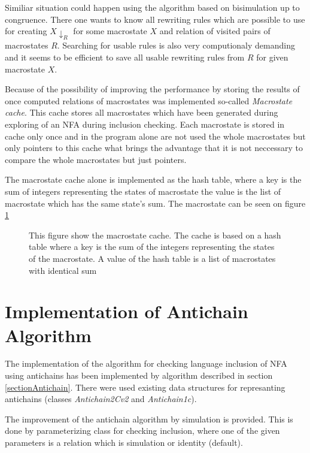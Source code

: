 Similiar situation could happen using the algorithm based on bisimulation up to congruence. There one wants to know all rewriting rules which are possible to use
for creating $X{\downarrow_R}$ for some macrostate $X$ and relation of visited pairs of macrostates $R$. Searching for usable rules is also very computionaly
demanding and it seems to be efficient to save all usable rewriting rules from $R$ for given macrostate $X$.

Because of the possibility of improving the performance by storing the results of once computed relations of macrostates was implemented so-called 
\emph{Macrostate cache}. This cache stores all macrostates which have been generated during exploring of an NFA during inclusion checking. Each macrostate is 
stored in cache only once and in the program alone are not used the whole macrostates but only pointers to this cache what brings the advantage that it is not
neccessary to compare the whole macrostates but just pointers.

The macrostate cache alone is implemented as the hash table, where a key is the sum of integers representing the states of macrostate the value is the
list of macrostate which has the same state's sum. The macrostate can be seen on figure \ref{figMacroCache}

\begin{figure}[h]
  
  \label{figMacroCache}
  \caption{This figure show the macrostate cache. The cache is based on a hash table where a key is 
    the sum of the integers representing the states of the macrostate. A value of the hash table is a list of macrostates with identical sum}
\end{figure}

\section{Implementation of Antichain Algorithm}
The implementation of the algorithm for checking language inclusion of NFA using antichains has been implemented by algorithm described in section 
\ref{sectionAntichain}.  There were used existing data structures for represanting antichains (classes \emph{Antichain2Cv2} and \emph{Antichain1c}). 

The improvement of the antichain algorithm by simulation is provided. This is done by parameterizing class for checking inclusion, where one of the given 
parameters is a relation which is simulation or identity (default).

